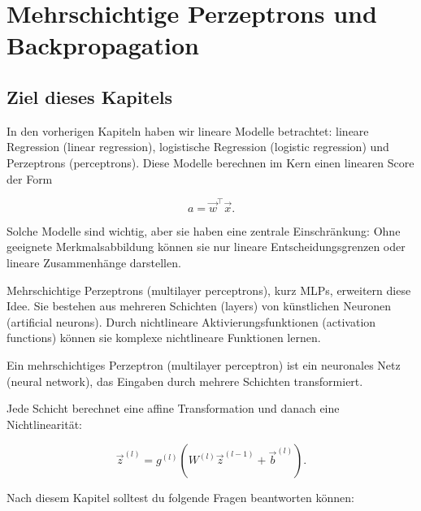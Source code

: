 \chapter{Mehrschichtige Perzeptrons und Backpropagation}

\section{Ziel dieses Kapitels}

In den vorherigen Kapiteln haben wir lineare Modelle betrachtet:
lineare Regression (linear regression), logistische Regression (logistic regression) und Perzeptrons (perceptrons).
Diese Modelle berechnen im Kern einen linearen Score der Form

\[
    a
    =
    \vec{w}^{\top}\vec{x}.
\]

Solche Modelle sind wichtig, aber sie haben eine zentrale Einschränkung:
Ohne geeignete Merkmalsabbildung können sie nur lineare Entscheidungsgrenzen oder lineare Zusammenhänge darstellen.

Mehrschichtige Perzeptrons (multilayer perceptrons), kurz MLPs, erweitern diese Idee.
Sie bestehen aus mehreren Schichten (layers) von künstlichen Neuronen (artificial neurons).
Durch nichtlineare Aktivierungsfunktionen (activation functions) können sie komplexe nichtlineare Funktionen lernen.

\begin{conceptbox}
Ein mehrschichtiges Perzeptron (multilayer perceptron) ist ein neuronales Netz (neural network), das Eingaben durch mehrere Schichten transformiert.

Jede Schicht berechnet eine affine Transformation und danach eine Nichtlinearität:

\[
    \vec{z}^{(l)}
    =
    g^{(l)}
    \left(
        W^{(l)}\vec{z}^{(l-1)}+\vec{b}^{(l)}
    \right).
\]
\end{conceptbox}

Nach diesem Kapitel solltest du folgende Fragen beantworten können:


